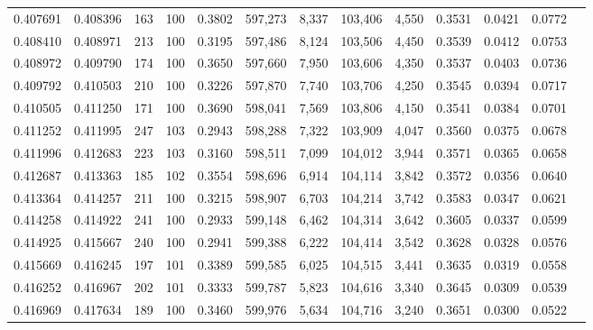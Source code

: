 \begin{tabular}{rrrrrrrrrrrrr}
0.407691 & 0.408396 &   163 & 100 &                                     0.3802 & 597,273 &   8,337 & 103,406 &   4,550 & 0.3531 & 0.0421 & 0.0772 \\
0.408410 & 0.408971 &   213 & 100 &                                     0.3195 & 597,486 &   8,124 & 103,506 &   4,450 & 0.3539 & 0.0412 & 0.0753 \\
0.408972 & 0.409790 &   174 & 100 &                                     0.3650 & 597,660 &   7,950 & 103,606 &   4,350 & 0.3537 & 0.0403 & 0.0736 \\
0.409792 & 0.410503 &   210 & 100 &                                     0.3226 & 597,870 &   7,740 & 103,706 &   4,250 & 0.3545 & 0.0394 & 0.0717 \\
0.410505 & 0.411250 &   171 & 100 &                                     0.3690 & 598,041 &   7,569 & 103,806 &   4,150 & 0.3541 & 0.0384 & 0.0701 \\
0.411252 & 0.411995 &   247 & 103 &                                     0.2943 & 598,288 &   7,322 & 103,909 &   4,047 & 0.3560 & 0.0375 & 0.0678 \\
0.411996 & 0.412683 &   223 & 103 &                                     0.3160 & 598,511 &   7,099 & 104,012 &   3,944 & 0.3571 & 0.0365 & 0.0658 \\
0.412687 & 0.413363 &   185 & 102 &                                     0.3554 & 598,696 &   6,914 & 104,114 &   3,842 & 0.3572 & 0.0356 & 0.0640 \\
0.413364 & 0.414257 &   211 & 100 &                                     0.3215 & 598,907 &   6,703 & 104,214 &   3,742 & 0.3583 & 0.0347 & 0.0621 \\
0.414258 & 0.414922 &   241 & 100 &                                     0.2933 & 599,148 &   6,462 & 104,314 &   3,642 & 0.3605 & 0.0337 & 0.0599 \\
0.414925 & 0.415667 &   240 & 100 &                                     0.2941 & 599,388 &   6,222 & 104,414 &   3,542 & 0.3628 & 0.0328 & 0.0576 \\
0.415669 & 0.416245 &   197 & 101 &                                     0.3389 & 599,585 &   6,025 & 104,515 &   3,441 & 0.3635 & 0.0319 & 0.0558 \\
0.416252 & 0.416967 &   202 & 101 &                                     0.3333 & 599,787 &   5,823 & 104,616 &   3,340 & 0.3645 & 0.0309 & 0.0539 \\
0.416969 & 0.417634 &   189 & 100 &                                     0.3460 & 599,976 &   5,634 & 104,716 &   3,240 & 0.3651 & 0.0300 & 0.0522 \\

\end{tabular}
